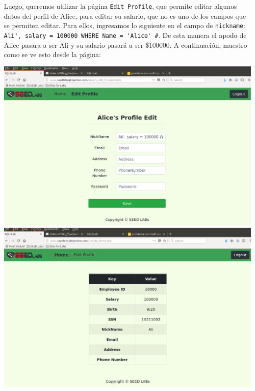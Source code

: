 \documentclass[11pt]{article}
\begin{document}
Luego, queremos utilizar la página \verb|Edit Profile|, que permite editar algunos datos del perfil de Alice, 
para editar su salario, que  no es uno de los campos que se permiten editar. Para ellos, ingresamos lo siguiente 
en el campo de \verb|nickname|: \verb|Ali', salary = 100000 WHERE Name = 'Alice' #|. De esta manera el apodo 
de Alice pasara a ser Ali y su salario pasará a ser \$100000. A continuación, muestro como se ve esto desde la página:
\begin{center}
    \includegraphics[scale=.34]{task3_1_3_sql.png}
    \includegraphics[scale=.34]{task3_1_4_sql.png}
\end{center}
\end{document}
